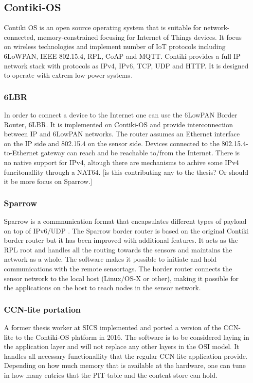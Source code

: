 \subsection{Contiki-OS}
Contiki OS is an open source operating system that is suitable for network-connected, memory-constrained focusing for Internet of Things devices\cite{contiki-os}. It focus on wireless technologies and implement number of IoT protocols including 6LoWPAN, IEEE 802.15.4, RPL, CoAP and MQTT. Contiki provides a full IP network stack with protocols as IPv4, IPv6, TCP, UDP and HTTP. It is designed to operate with extrem low-power systems.

\subsubsection{6LBR}
In order to connect a device to the Internet one can use the 6LowPAN Border Router, 6LBR\cite{6LBR}. It is implemented on Contiki-OS and provide interconnection between IP and 6LowPAN networks. The router assumes an Ethernet interface on the IP side and 802.15.4 on the sensor side. Devices connected to the 802.15.4-to-Ethernet gateway can reach and be reachable to/from the Internet. There is no native support for IPv4, altough there are mechanisms to achive some IPv4 funcitonallity through a NAT64. [is this contributing any to the thesis? Or should it be more focus on Sparrow.]

\subsubsection{Sparrow}
Sparrow is a commnunication format that encapsulates different types of payload on top of IPv6/UDP \cite{Sparrow}. The Sparrow border router is based on the original Contiki border router but it has been improved with additional features. It acts as the RPL root and handles all the routing towards the sensors and maintains the network as a whole. The software makes it possible to initiate and hold communications with the remote sensortags. The border router connects the sensor network to the local host (Linux/OS-X or other), making it possible for the applications on the host to reach nodes in the sensor network. 

\subsubsection{CCN-lite portation}
A former thesis worker at SICS implemented and ported a version of the CCN-lite\cite{CCN-LITE} to the Contiki-OS platform in 2016\cite{yanqui}. The software is to be considered laying in the application layer and will not replace any other layers in the OSI model. It handles all necessary functionallity that the regular CCN-lite application provide. Depending on how much memory that is available at the hardware, one can tune in how many entries that the PIT-table and the content store can hold. 
